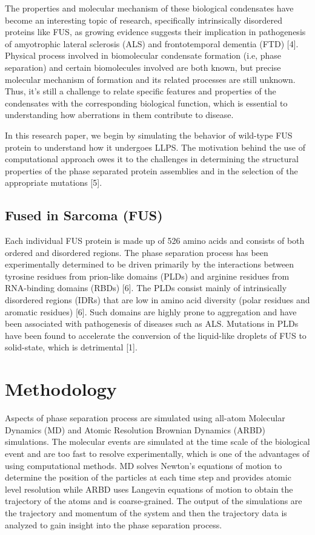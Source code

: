 \documentclass[12ptr]{article}
\begin{document}
The properties and molecular mechanism of these biological condensates have become an interesting topic of research, specifically intrinsically disordered proteins like FUS, as growing evidence suggests their implication in pathogenesis of amyotrophic lateral sclerosis (ALS) and frontotemporal dementia (FTD) [4]. Physical process involved in biomolecular condensate formation (i.e, phase separation) and certain biomolecules involved are both known, but precise molecular mechanism of formation and its related processes are still unknown. Thus, it’s still a challenge to relate specific features and properties of the condensates with the corresponding biological function, which is essential to understanding how aberrations in them contribute to disease. 

In this research paper, we begin by simulating the behavior of wild-type FUS protein to understand how it undergoes LLPS. The motivation behind the use of computational approach owes it to the challenges in determining the structural properties of the phase separated protein assemblies and in the selection of the appropriate mutations [5]. 

\subsection{Fused in Sarcoma (FUS)}

Each individual FUS protein is made up of 526 amino acids and consists of both ordered and disordered regions. The phase separation process has been experimentally determined to be driven primarily by the interactions between tyrosine residues from prion-like domains (PLDs) and arginine residues from RNA-binding domains (RBDs) [6]. The PLDs consist mainly of intrinsically disordered regions (IDRs) that are low in amino acid diversity (polar residues and aromatic residues) [6]. Such domains are highly prone to aggregation and have been associated with pathogenesis of diseases such as ALS. Mutations in PLDs have been found to accelerate the conversion of the liquid-like droplets of FUS to solid-state, which is detrimental [1].


\newpage

\section{Methodology}
Aspects of phase separation process are simulated using all-atom Molecular Dynamics (MD) and Atomic Resolution Brownian Dynamics (ARBD) simulations.  The molecular events are simulated at the time scale of the biological event and are too fast to resolve experimentally, which is one of the advantages of using computational methods. MD solves Newton’s equations of motion to determine the position of the particles at each time step and provides atomic level resolution while ARBD uses Langevin equations of motion to obtain the trajectory of the atoms and is coarse-grained. The output of the simulations are the trajectory and momentum of the system and then the trajectory data is analyzed to gain insight into the phase separation process. \\
\end{document}
